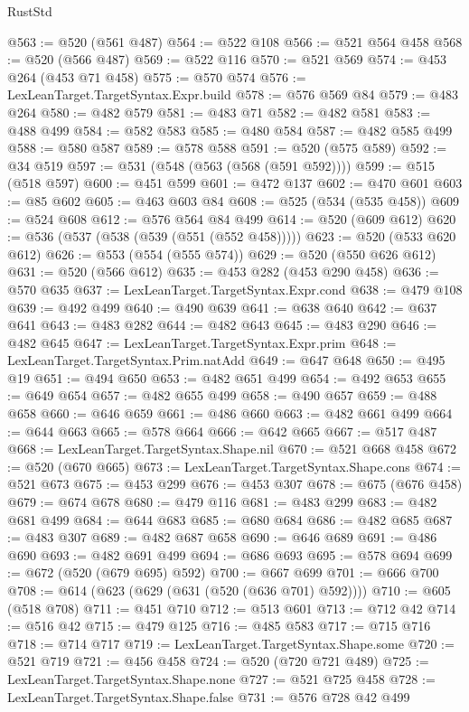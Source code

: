 \begin{lexlean}{RustStd}
\begin{coremodule}
@563 := @520 (@561 @487)
@564 := @522 @108
@566 := @521 @564 @458
@568 := @520 (@566 @487)
@569 := @522 @116
@570 := @521 @569
@574 := @453 @264 (@453 @71 @458)
@575 := @570 @574
@576 := LexLeanTarget.TargetSyntax.Expr.build
@578 := @576 @569 @84
@579 := @483 @264
@580 := @482 @579
@581 := @483 @71
@582 := @482 @581
@583 := @488 @499
@584 := @582 @583
@585 := @480 @584
@587 := @482 @585 @499
@588 := @580 @587
@589 := @578 @588
@591 := @520 (@575 @589)
@592 := @34 @519
@597 := @531 (@548 (@563 (@568 (@591 @592))))
@599 := @515 (@518 @597)
@600 := @451 @599
@601 := @472 @137
@602 := @470 @601
@603 := @85 @602
@605 := @463 @603 @84
@608 := @525 (@534 (@535 @458))
@609 := @524 @608
@612 := @576 @564 @84 @499
@614 := @520 (@609 @612)
@620 := @536 (@537 (@538 (@539 (@551 (@552 @458)))))
@623 := @520 (@533 @620 @612)
@626 := @553 (@554 (@555 @574))
@629 := @520 (@550 @626 @612)
@631 := @520 (@566 @612)
@635 := @453 @282 (@453 @290 @458)
@636 := @570 @635
@637 := LexLeanTarget.TargetSyntax.Expr.cond
@638 := @479 @108
@639 := @492 @499
@640 := @490 @639
@641 := @638 @640
@642 := @637 @641
@643 := @483 @282
@644 := @482 @643
@645 := @483 @290
@646 := @482 @645
@647 := LexLeanTarget.TargetSyntax.Expr.prim
@648 := LexLeanTarget.TargetSyntax.Prim.natAdd
@649 := @647 @648
@650 := @495 @19
@651 := @494 @650
@653 := @482 @651 @499
@654 := @492 @653
@655 := @649 @654
@657 := @482 @655 @499
@658 := @490 @657
@659 := @488 @658
@660 := @646 @659
@661 := @486 @660
@663 := @482 @661 @499
@664 := @644 @663
@665 := @578 @664
@666 := @642 @665
@667 := @517 @487
@668 := LexLeanTarget.TargetSyntax.Shape.nil
@670 := @521 @668 @458
@672 := @520 (@670 @665)
@673 := LexLeanTarget.TargetSyntax.Shape.cons
@674 := @521 @673
@675 := @453 @299
@676 := @453 @307
@678 := @675 (@676 @458)
@679 := @674 @678
@680 := @479 @116
@681 := @483 @299
@683 := @482 @681 @499
@684 := @644 @683
@685 := @680 @684
@686 := @482 @685
@687 := @483 @307
@689 := @482 @687 @658
@690 := @646 @689
@691 := @486 @690
@693 := @482 @691 @499
@694 := @686 @693
@695 := @578 @694
@699 := @672 (@520 (@679 @695) @592)
@700 := @667 @699
@701 := @666 @700
@708 := @614 (@623 (@629 (@631 (@520 (@636 @701) @592))))
@710 := @605 (@518 @708)
@711 := @451 @710
@712 := @513 @601
@713 := @712 @42
@714 := @516 @42
@715 := @479 @125
@716 := @485 @583
@717 := @715 @716
@718 := @714 @717
@719 := LexLeanTarget.TargetSyntax.Shape.some
@720 := @521 @719
@721 := @456 @458
@724 := @520 (@720 @721 @489)
@725 := LexLeanTarget.TargetSyntax.Shape.none
@727 := @521 @725 @458
@728 := LexLeanTarget.TargetSyntax.Shape.false
@731 := @576 @728 @42 @499

\end{coremodule}
\end{lexlean}
